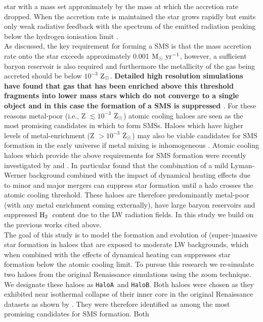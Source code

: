 \documentclass[twocolumn,iop,revtex4]{openjournal}
\newcommand{\msolaryrc} {$\rm{M_{\odot}~yr^{-1}}$}
\newcommand{\zsolarc} {$\rm{Z_{\odot}}$}
\newcommand{\molH} {$\rm{H_2}$~}
\newcommand{\ha} {\texttt{HaloA~}}
\newcommand{\hbc} {\texttt{HaloB}}
\begin{document}
star with a mass set approximately by the mass at which the accretion rate dropped.
When the accretion rate is maintained the star grows rapidly but emits
only weak radiative feedback with the spectrum of the emitted radiation peaking below
the hydrogen ionisation limit \citep{Woods_2018}. \\
\indent As discussed, the key requirement for
forming a SMS is that the mass accretion rate onto the star exceeds approximately 0.001 \msolaryrc,
however, a sufficient baryon reservoir is also required and furthermore the metallicity of the gas
being accreted should be below $10^{-3}$ \zsolarc.  \textbf{Detailed high resolution simulations have found that gas that has been enriched above this threshold fragments into lower mass stars which do not converge to a single object and in this case the formation of a SMS is suppressed \citep[e.g.][]{Chon_2020}}. For these reasons
metal-poor (i.e., Z $\lesssim 10^{-3}$ \zsolarc) atomic cooling haloes are seen as the most 
promising candidates in which to form SMSs. Haloes which have higher levels of 
metal-enrichment (Z $> 10^{-3}$ \zsolarc) may also be viable candidates for 
SMS formation in the early universe if metal mixing is inhomogeneous \citep{Regan_2020a}. Atomic cooling
haloes which provide the above requirements for SMS formation were recently investigated by \cite{Wise_2019}
and \cite{Regan_2020}. In particular \cite{Wise_2019} found that the combination 
of a mild Lyman-Werner background combined with the impact of dynamical heating effects due to
minor and major mergers can suppress star formation until a halo crosses the atomic cooling threshold.
These haloes are therefore predominantly metal-poor (with any metal enrichment coming externally), have large 
baryon reservoirs and suppressed \molH content due to the LW radiation fields. 
In this study we build on the previous works cited above. \\
\indent The goal of this study is to model the formation and evolution of (super-)massive star
formation in haloes that are exposed to moderate LW backgrounds, which when combined with
the effects of dynamical heating can suppresses star formation below the atomic cooling limit.
  To pursue this research we re-simulate
  two haloes from the original Renaissance simulations using the zoom technique.
  We designate
  these haloes as \ha and \hbc. Both haloes were chosen as they exhibited near isothermal
  collapse of their inner core in the original Renaissance datasets as shown by \cite{Regan_2020}.
  They were therefore identified as among the most promising candidates for SMS formation. Both
\end{document}
